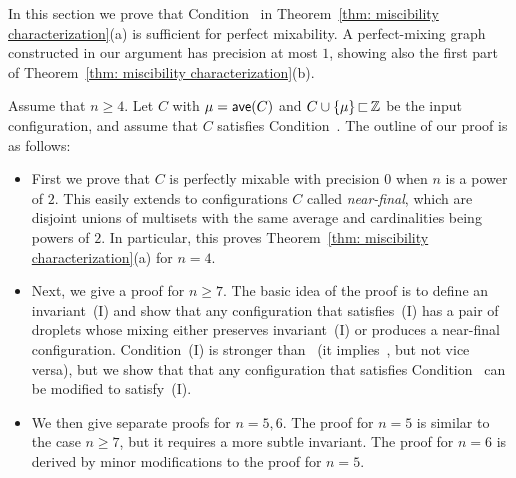 

%

In this section we prove that Condition~{\MixCond} in Theorem~\ref{thm: miscibility characterization}(a) 
is sufficient for perfect mixability. A perfect-mixing graph constructed in our argument has
precision at most $1$, showing also the first part of Theorem~\ref{thm: miscibility characterization}(b).

Assume that $n\ge 4$. Let $C$ with $\mu = {\textsf{ave}}(C)$ and 
$C\cup{ \left\{ \mu \right\} }{\,\sqsubset\,}{\mathbb Z}$ be the input configuration,
and assume that $C$ satisfies Condition~{\MixCond}. 
The outline of our proof is as follows:
%
\begin{itemize}
	\item First we prove that $C$ is perfectly mixable with precision $0$ when $n$ is a power of $2$.
		This easily extends to configurations $C$ called \emph{near-final}, 
		which are disjoint unions of multisets with the same average and cardinalities being powers of $2$. 
		In particular, this proves Theorem~\ref{thm: miscibility characterization}(a) for $n=4$.
		
	\item Next, we give a proof for $n\ge 7$. The basic idea of the proof is
		to define an invariant~(I) and show that any configuration that
		satisfies~(I) has a pair of droplets whose mixing either preserves
		invariant~(I) or produces a near-final configuration. 
		Condition~(I) is stronger than~{\MixCond} (it implies~{\MixCond}, but not
		vice versa), but we show that
		that any configuration that satisfies Condition~{\MixCond} can be
		modified to satisfy~(I).
		
	\item We then give separate proofs for $n=5,6$.
		The proof for $n=5$ is similar to the case $n\ge 7$, but
		it requires a more subtle invariant.
		The proof for $n=6$ is derived by minor modifications to the proof for $n=5$.
\end{itemize}
